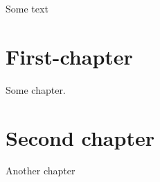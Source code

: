 \documentclass{report}
\begin{document}
Some text
\chapter{First-chapter}
Some chapter.

\chapter{Second chapter}
Another chapter
\end{document}

